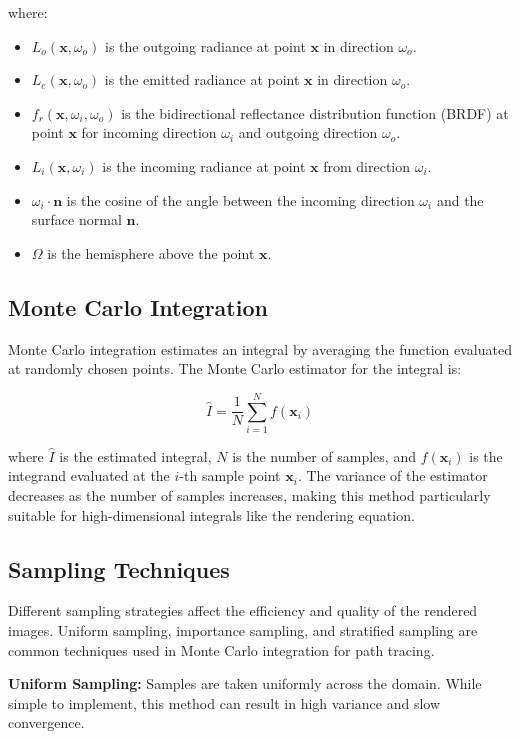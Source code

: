 \documentclass[12pt]{article}
\begin{document}
where:
\begin{itemize}
    \item $L_o(\mathbf{x}, \omega_o)$ is the outgoing radiance at point $\mathbf{x}$ in direction $\omega_o$.
    \item $L_e(\mathbf{x}, \omega_o)$ is the emitted radiance at point $\mathbf{x}$ in direction $\omega_o$.
    \item $f_r(\mathbf{x}, \omega_i, \omega_o)$ is the bidirectional reflectance distribution function (BRDF) at point $\mathbf{x}$ for incoming direction $\omega_i$ and outgoing direction $\omega_o$.
    \item $L_i(\mathbf{x}, \omega_i)$ is the incoming radiance at point $\mathbf{x}$ from direction $\omega_i$.
    \item $\omega_i \cdot \mathbf{n}$ is the cosine of the angle between the incoming direction $\omega_i$ and the surface normal $\mathbf{n}$.
    \item $\Omega$ is the hemisphere above the point $\mathbf{x}$.
\end{itemize}

\subsection{Monte Carlo Integration}
Monte Carlo integration estimates an integral by averaging the function evaluated at randomly chosen points. The Monte Carlo estimator for the integral is:

\begin{equation}
    \hat{I} = \frac{1}{N} \sum_{i=1}^{N} f(\mathbf{x}_i)
\end{equation}

where $\hat{I}$ is the estimated integral, $N$ is the number of samples, and $f(\mathbf{x}_i)$ is the integrand evaluated at the $i$-th sample point $\mathbf{x}_i$. The variance of the estimator decreases as the number of samples increases, making this method particularly suitable for high-dimensional integrals like the rendering equation.

\subsection{Sampling Techniques}
Different sampling strategies affect the efficiency and quality of the rendered images. Uniform sampling, importance sampling, and stratified sampling are common techniques used in Monte Carlo integration for path tracing.

\textbf{Uniform Sampling:} Samples are taken uniformly across the domain. While simple to implement, this method can result in high variance and slow convergence.
\end{document}
